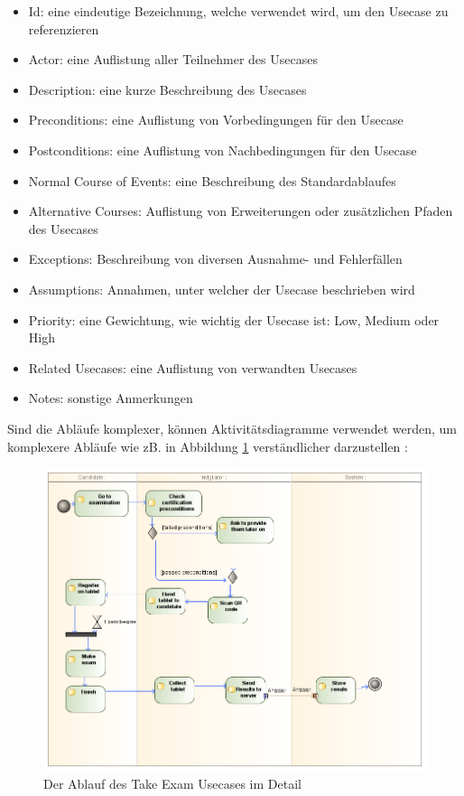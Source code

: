 \begin{itemize}
  \item Id: eine eindeutige Bezeichnung, welche verwendet wird, um den Usecase zu referenzieren
  \item Actor: eine Auflistung aller Teilnehmer des Usecases
  \item Description: eine kurze Beschreibung des Usecases
  \item Preconditions: eine Auflistung von Vorbedingungen für den Usecase
  \item Postconditions: eine Auflistung von Nachbedingungen für den Usecase
  \item Normal Course of Events: eine Beschreibung des Standardablaufes
  \item Alternative Courses: Auflistung von Erweiterungen oder zusätzlichen Pfaden des Usecases
  \item Exceptions: Beschreibung von diversen Ausnahme- und Fehlerfällen
  \item Assumptions: Annahmen, unter welcher der Usecase beschrieben wird
  \item Priority: eine Gewichtung, wie wichtig der Usecase ist: Low, Medium oder High
  \item Related Usecases: eine Auflistung von verwandten Usecases
  \item Notes: sonstige Anmerkungen
\end{itemize}

Sind die Abläufe komplexer, können Aktivitätsdiagramme verwendet werden, um komplexere Abläufe wie zB. in Abbildung \ref{fig:takexdet} verständlicher darzustellen \cite[S. 215]{reqman}:

\begin{figure}[H]
    \centering
    \includegraphics[scale=0.4]{uml/takeexamreq.png}
    \caption{Der Ablauf des Take Exam Usecases im Detail}
    \label{fig:takexdet}
\end{figure}

